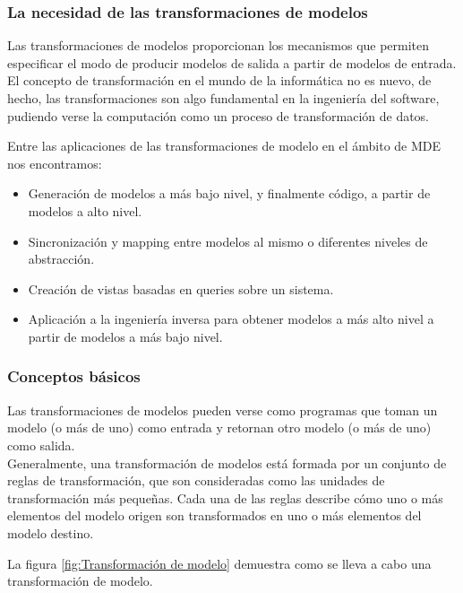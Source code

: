 \subsubsection*{La necesidad de las transformaciones de modelos} 
\label{La necesidad de las transformaciones de modelos} 

Las transformaciones de modelos proporcionan los mecanismos que permiten especificar el modo de producir modelos de salida a partir de modelos de entrada.\\
El concepto de transformación en el mundo de la informática no es nuevo, de hecho, las transformaciones son algo fundamental en la ingeniería del software, pudiendo verse la computación como un proceso de transformación de datos.

Entre las aplicaciones de las transformaciones de modelo en el ámbito de MDE nos encontramos:

\begin{itemize}
	\item Generación de modelos a más bajo nivel, y finalmente código, a partir de modelos a alto nivel.
	\item Sincronización y mapping entre modelos al mismo o diferentes niveles de abstracción.
	\item Creación de vistas basadas en queries sobre un sistema.
	\item Aplicación a la ingeniería inversa para obtener modelos a más alto nivel a partir de modelos a más bajo nivel.
\end{itemize}

\subsubsection*{Conceptos básicos}
\label{Conceptos básicos}

Las transformaciones de modelos pueden verse como programas que toman un modelo (o más de uno) como entrada y retornan otro modelo (o más de uno) como salida.\\
Generalmente, una transformación de modelos está formada por un conjunto de reglas de transformación, que son consideradas como las unidades de transformación más pequeñas. Cada una de las reglas describe cómo uno o más elementos del modelo origen son transformados en uno o más elementos del modelo destino.

La figura \ref{fig:Transformación de modelo} demuestra como se lleva a cabo una transformación de modelo.

